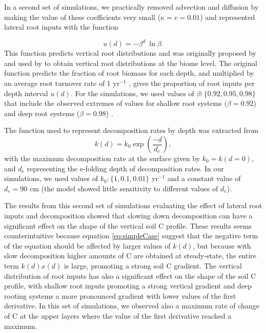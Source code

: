 \documentclass[11pt, oneside, a4paper]{article}   	%
\begin{document}
In a second set of simulations, we practically removed advection and diffusion by making the value of these coefficients very small ($\kappa = v =0.01$) and represented lateral root inputs with the function

\begin{equation} \label{eq:ud}
u(d) = - \beta^d \ \ln \beta .
\end{equation}
This function predicts vertical root distributions and was originally proposed by \citet{Gale1987} and used by \citet{Jackson1996, Jackson1997} to obtain vertical root distributions at the biome level. The original function predicts the fraction of root biomass for each depth, and multiplied by an average root turnover rate of 1 yr$^{-1}$ \citep{Gill2000}, gives the proportion of root inputs per depth interval $u(d)$. For the simulations, we used values of $\beta : \{0.92, 0.95, 0.98 \}$ that include the observed extremes of values for shallow root systems ($\beta =0.92$) and deep root systems ($\beta = 0.98$) \citep{Gale1987, Jackson1996}.

The function used to represent decomposition rates by depth was extracted from \citet{Koven2013BGS}
\begin{equation} \label{eq:kd}
k(d) = k_0 \exp \left(\frac{-d}{d_e} \right),
\end{equation}
with the maximum decomposition rate at the surface given by $k_0 = k(d=0)$, and $d_e$ representing the e-folding depth of decomposition rates. In our simulations, we used values of $k_0 : \{1, 0.1, 0.01 \}$ yr$^{-1}$ and a constant value of $d_e = 90$ cm (the model showed little sensitivity to different values of $d_e$).

The results from this second set of simulations evaluating the effect of lateral root inputs and decomposition showed that slowing down decomposition can have a significant effect on the shape of the vertical soil C profile. These results seems counterintuitive because equation \ref{eq:simpleCase} suggest that the negative term of the equation should be affected by larger values of $k(d)$, but because with slow decomposition higher amounts of C are obtained at steady-state, the entire term $k(d) x(d)$ is large, promoting a strong soil C gradient. The vertical distribution of root inputs has also a significant effect on the shape of the soil C profile, with shallow root inputs promoting a strong vertical gradient and deep rooting systems a more pronounced gradient with lower values of the first derivative. In this set of simulations, we observed also a maximum rate of change of C at the upper layers where the value of the first derivative reached a maximum. 
\end{document}
